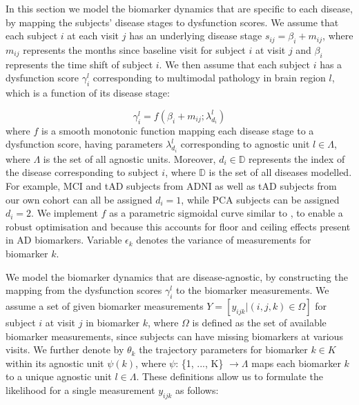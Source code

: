 \documentclass{llncs}
\begin{document}
In this section we model the biomarker dynamics that are specific to each disease, by mapping the subjects' disease stages to dysfunction scores. We assume that each subject $i$ at each visit $j$ has an underlying disease stage $s_{ij} = \beta_i + m_{ij}$, where $m_{ij}$ represents the months since baseline visit for subject $i$ at visit $j$ and $\beta_i$ represents the time shift of subject $i$. We then assume that each subject $i$ has a dysfunction score $\gamma_i^l$ corresponding to multimodal pathology in brain region $l$, which is a function of its disease stage:

\begin{equation}
\label{eqDysfunctionScoreDef}
 \gamma_i^l = f(\beta_i + m_{ij}; \lambda_{d_i}^l)
\end{equation}
where $f$ is a smooth monotonic function mapping each disease stage to a dysfunction score, having parameters $\lambda_{d_i}^l$ corresponding to agnostic unit $l \in \Lambda$, where $\Lambda$ is the set of all agnostic units. Moreover, $d_i \in \mathbb{D}$ represents the index of the disease corresponding to subject $i$, where $\mathbb{D}$ is the set of all diseases modelled. For example, MCI and tAD subjects from ADNI as well as tAD subjects from our own cohort can all be assigned $d_i=1$, while PCA subjects can be assigned $d_i=2$.  We implement $f$ as a parametric sigmoidal curve similar to \cite{jedynak2012computational}, to enable a robust optimisation and because this accounts for floor and ceiling effects present in AD biomarkers. Variable $\epsilon_k$ denotes the variance of measurements for biomarker $k$. 


We model the biomarker dynamics that are disease-agnostic, by constructing the mapping from the dysfunction scores $\gamma_i^l$ to the biomarker measurements. We assume a set of given biomarker measurements $Y = [y_{ijk} | (i,j,k) \in \Omega]$ for subject $i$ at visit $j$ in biomarker $k$, where $\Omega$ is defined as the set of available biomarker measurements, since subjects can have missing biomarkers at various visits. We further denote by $\theta_k$ the trajectory parameters for biomarker $k \in K$ within its agnostic unit $\psi(k)$, where $\psi$: \{1, ..., K\} $ \rightarrow \Lambda$ maps each biomarker $k$ to a unique agnostic unit $l \in \Lambda$. These definitions allow us to formulate the likelihood for a single measurement $y_{ijk}$ as follows:
\end{document}

